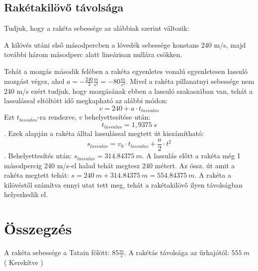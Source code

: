 \documentclass{article}[12pt,a4paper]
\begin{document}
\subsection{Rakétakilövő távolsága}
Tudjuk, hogy a rakéta sebessége az alábbiak szerint változik: \begin{displayquote}A kilövés utáni első másodpercben a lövedék sebessége konstans 240 m/s, majd további három másodperc alatt lineárisan nullára csökken.\end{displayquote}
Tehát a mozgás második felében a rakéta egyenletes vonalú egyenletesen lassuló mozgást végez, ahol $a = -\frac{240}{3} \frac{m}{s^2} = -80 \frac{m}{s^2}$. Mivel a rakéta pillanatnyi sebessége nem 240 m/s ezért tudjuk, hogy mozgásának ebben a lassuló szakaszában van, tehát a lassulással eltöltött idő megkapható az alábbi módon: $$v = 240 + a \cdot t_{lassulas}$$ Ezt $t_{lassulas}$-ra rendezve, $v$ behelyettesítése után: $$t_{lassulas} = 1,9375\ s$$.
Ezek alapján a rakéta álltal lassulással megtett út kiszámítható: $$s_{lassulas} = v_0\cdot t_{lassulas} + \frac{a}{2} \cdot t^2$$. Behelyettesítés után: $s_{lassulas} = 314.84375\ m$. A lassulás előtt a rakéta még 1 másodpercig 240 m/s-el halad tehát megtesz 240 métert. Az össz. út amit a rakéta megtett tehát: $s = 240\ m + 314.84375\ m = 554.84375\ m$. A rakéta a kilövéstől számítva ennyi utat tett meg, tehát a rakétakilövő ilyen távolságban helyezkedik el.

\section{Összegzés}

A rakéta sebessége a Tatain fölött: $85 \frac{m}{s}$.
A rakétás távolsága az űrhajótól: $555\ m$ ( Kerekítve )
\end{document}

